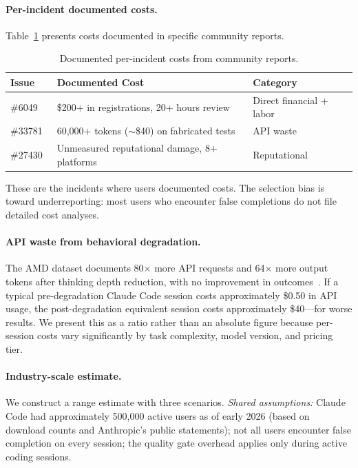 \paragraph{Per-incident documented costs.}
Table~\ref{tab:incident-costs} presents costs documented in specific community reports.

\begin{table}[h]
\centering
\caption{Documented per-incident costs from community reports.}
\label{tab:incident-costs}
\begin{tabular}{lll}
\toprule
Issue & Documented Cost & Category \\
\midrule
\#6049~\cite{ghissue6049}   & \$200+ in registrations, 20+ hours review & Direct financial + labor \\
\#33781~\cite{ghissue33781} & 60{,}000+ tokens ($\sim$\$40) on fabricated tests & API waste \\
\#27430~\cite{ghissue27430} & Unmeasured reputational damage, 8+ platforms & Reputational \\
\bottomrule
\end{tabular}
\end{table}

These are the incidents where users documented costs.
The selection bias is toward underreporting: most users who encounter false completions do not file detailed cost analyses.

\paragraph{API waste from behavioral degradation.}
The AMD dataset documents 80$\times$ more API requests and 64$\times$ more output tokens after thinking depth reduction, with no improvement in outcomes~\cite{laurenzo2026amd}.
If a typical pre-degradation Claude Code session costs approximately \$0.50 in API usage, the post-degradation equivalent session costs approximately \$40---for worse results.
We present this as a ratio rather than an absolute figure because per-session costs vary significantly by task complexity, model version, and pricing tier.

\paragraph{Industry-scale estimate.}
We construct a range estimate with three scenarios.
\emph{Shared assumptions:} Claude Code had approximately 500{,}000 active users as of early 2026 (based on download counts and Anthropic's public statements); not all users encounter false completion on every session; the quality gate overhead applies only during active coding sessions.

